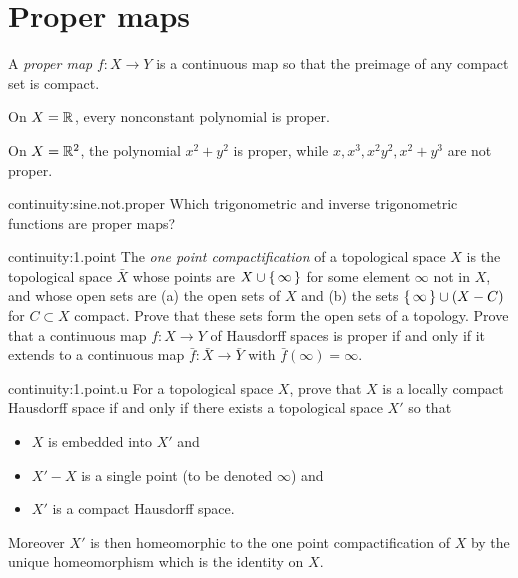 \section{Proper maps}
A \emph{proper map} \(f \colon X \to Y\) is a continuous map so that the preimage of any compact set is compact.
\begin{example}
On \(X=\mathbb{R}^{}\), every nonconstant polynomial is proper.
\end{example}
\begin{example}
On \(X=\mathbb{R}^{2}\), the polynomial \(x^2+y^2\) is proper, while \(x,x^3,x^2y^2,x^2+y^3\) are not proper.
\end{example}
\begin{problem}{continuity:sine.not.proper}
Which trigonometric and inverse trigonometric functions are proper maps?
\end{problem}
\begin{problem}{continuity:1.point}
The \emph{one point compactification} of a topological space \(X\) is the topological space \(\bar{X}\) whose points are \(X \cup \set{\infty}\) for some element \(\infty\) not in \(X\), and whose open sets are (a) the open sets of \(X\) and (b) the sets \(\set{\infty} \cup (X-C)\) for \(C \subset X\) compact.
Prove that these sets form the open sets of a topology.
Prove that a continuous map \(f \colon X \to Y\) of Hausdorff spaces is proper if and only if it extends to a continuous map \(\bar{f} \colon \bar{X} \to \bar{Y}\) with \(\bar{f}(\infty)=\infty\).
\end{problem}
\begin{problem}{continuity:1.point.u}
For a topological space \(X\), prove that \(X\) is a locally compact Hausdorff space if and only if there exists a topological space \(X'\) so that
\begin{itemize}
\item
\(X\) is embedded into \(X'\) and
\item
\(X'-X\) is a single point (to be denoted \(\infty\)) and
\item
\(X'\) is a compact Hausdorff space.
\end{itemize}
Moreover \(X'\) is then homeomorphic to the one point compactification of \(X\) by the unique homeomorphism which is the identity on \(X\).
\end{problem}
